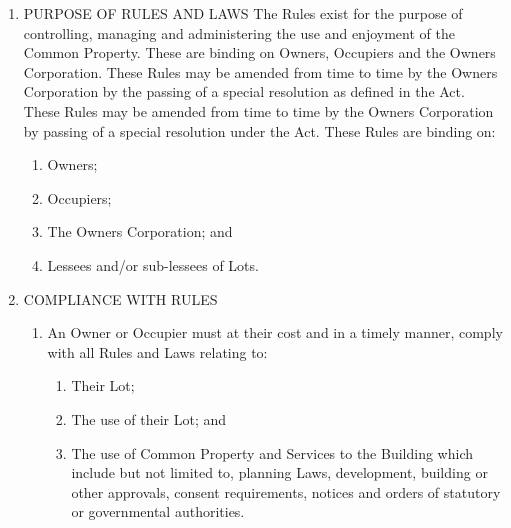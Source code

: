 \documentclass{article}
\begin{document}
\begin{enumerate}[label=\arabic*.]
\begin{enumerate}[label=\arabic{enumi}.\arabic*.]
\begin{enumerate}[label=(\arabic*)]
\begin{enumerate}[label=(\alph*)]
\end{enumerate}

\end{enumerate}

\end{enumerate}

\item  PURPOSE OF RULES AND LAWS The Rules exist for the purpose of controlling, managing and administering the use and enjoyment of the Common Property. These are binding on Owners, Occupiers and the Owners Corporation. These Rules may be amended from time to time by the Owners Corporation by the passing of a special resolution as defined in the Act. These Rules may be amended from time to time by the Owners Corporation by passing of a special resolution under the Act. These Rules are binding on:

\begin{enumerate}[label=(\arabic*)]

\item  Owners;

\item  Occupiers;

\item  The Owners Corporation; and

\item  Lessees and/or sub-lessees of Lots.

\end{enumerate}

\item  COMPLIANCE WITH RULES

\begin{enumerate}[label=\arabic{enumi}.\arabic*.]

\item  An Owner or Occupier must at their cost and in a timely manner, comply with all Rules and Laws relating to:

\begin{enumerate}[label=(\arabic*)]

\item  Their Lot;

\item  The use of their Lot; and

\item  The use of Common Property and Services to the Building which include but not limited to, planning Laws, development, building or other approvals, consent requirements, notices and orders of statutory or governmental authorities.


\end{enumerate}
\end{enumerate}
\end{enumerate}
\end{document}
